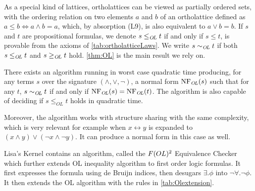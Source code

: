 As a special kind of lattices, ortholattices can be viewed as partially ordered sets, with the ordering relation on two elements $a$ and $b$ of an ortholattice defined as
\(
a\leq b \iff a \land b = a
\), which, by absorption (L9), is also equivalent to $a \lor b = b$. If $s$ and $t$ are propositional formulas, we denote $s \leq_{\mathit{O{\kern-0.1em}L}} t $ if and only if $s \leq t$, is provable from the axioms of \autoref{tab:ortholatticeLaws}.
We write $s\sim_{\mathit{O{\kern-0.1em}L}} t$ if both $s\leq_{\mathit{O{\kern-0.1em}L}} t$ and $s\geq_{\mathit{O{\kern-0.1em}L}} t$ hold.
\autoref{thm:OL} is the main result we rely on.

\begin{theorem}
  \label{thm:OL}
  There exists an algorithm running in worst case quadratic time producing, for any terms $s$ over the signature $(\land, \lor, \neg)$, a normal form $\text{NF}_{\mathit{O{\kern-0.1em}L}}(s)$
  such that for any $t$, $s \sim_{\mathit{O{\kern-0.1em}L}} t$ if and only if $\text{NF}_{\mathit{O{\kern-0.1em}L}}(s) = \text{NF}_{\mathit{O{\kern-0.1em}L}}(t)$. The algorithm is also capable of deciding if $s \leq_{OL} t$ holds in quadratic time.
\end{theorem}
Moreover, the algorithm works with structure sharing with the same complexity, which is very relevant for example when $x \leftrightarrow y$ is expanded to $(x \land y) \lor (\neg x \land \neg y)$. It can produce a normal form in this case as well.

Lisa's Kernel contains an algorithm, called the $F(OL)\textsuperscript{2}{}$ Equivalence Checker which further extends OL inequality algorithm to first order logic formulas. It first expresses the formula using de Bruijn indices, then desugars $\exists. \phi$ into $\neg \forall. \neg \phi$. It then extends the OL algorithm with the rules in \autoref{tab:Olextension}.


